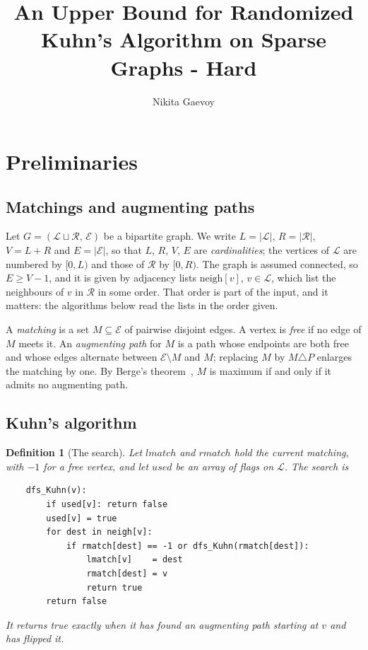 \documentclass[10pt]{article}
\title{An Upper Bound for Randomized Kuhn's Algorithm on Sparse Graphs - Hard}
\author{Nikita Gaevoy}
\date{}
\newtheorem{definition}{Definition}
\begin{document}
\maketitle

\section{Preliminaries}

\subsection{Matchings and augmenting paths}

Let $G=(\mathcal{L}\sqcup\mathcal{R},\,\mathcal{E})$ be a bipartite graph. We
write $L=|\mathcal{L}|$, $R=|\mathcal{R}|$, $V=L+R$ and $E=|\mathcal{E}|$, so
that $L$, $R$, $V$, $E$ are \emph{cardinalities}; the vertices of $\mathcal{L}$
are numbered by $[0,L)$ and those of $\mathcal{R}$ by $[0,R)$. The graph is
assumed connected, so $E\ge V-1$, and it is given by adjacency lists
$\mathrm{neigh}[v]$, $v\in\mathcal{L}$, which list the neighbours of $v$ in
$\mathcal{R}$ in some order. That order is part of the input, and it matters:
the algorithms below read the lists in the order given.

A \emph{matching} is a set $M\subseteq\mathcal{E}$ of pairwise disjoint edges.
A vertex is \emph{free} if no edge of $M$ meets it. An \emph{augmenting path}
for $M$ is a path whose endpoints are both free and whose edges alternate
between $\mathcal{E}\setminus M$ and $M$; replacing $M$ by $M\triangle P$
enlarges the matching by one. By Berge's theorem~\cite{Berge57}, $M$ is maximum
if and only if it admits no augmenting path.

\subsection{Kuhn's algorithm}

\begin{definition}[The search]\label{def:dfs}
Let $\mathit{lmatch}$ and $\mathit{rmatch}$ hold the current matching, with
$-1$ for a free vertex, and let $\mathit{used}$ be an array of flags on
$\mathcal{L}$. The search is
\begin{verbatim}
    dfs_Kuhn(v):
        if used[v]: return false
        used[v] = true
        for dest in neigh[v]:
            if rmatch[dest] == -1 or dfs_Kuhn(rmatch[dest]):
                lmatch[v]    = dest
                rmatch[dest] = v
                return true
        return false
\end{verbatim}
It returns true exactly when it has found an augmenting path starting at $v$ and
has flipped it.
\end{definition}
\end{document}
